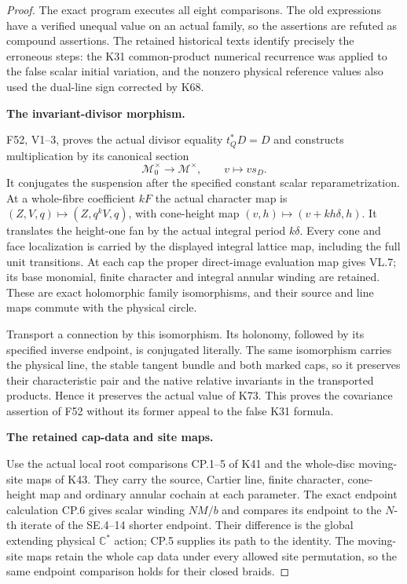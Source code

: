 \begin{proof}
The exact program
executes all eight comparisons. The old expressions have a
verified unequal value on an actual family, so the assertions
are refuted as compound assertions. The retained historical
texts identify precisely the erroneous steps: the K31
common-product numerical recurrence was applied to the false
scalar initial variation, and the nonzero physical reference
values also used the dual-line sign corrected by K68.

\par\medskip\noindent\textbf{The invariant-divisor morphism.}\par\nopagebreak[4]
F52, V1--3, proves the actual divisor equality \(t_Q^*D=D\)
and constructs multiplication by its canonical section
\[
 \mathcal M_0^\times\longrightarrow\mathcal M^\times,
 \qquad v\longmapsto v s_D.
\]
It conjugates the suspension after the specified constant
scalar reparametrization. At a whole-fibre coefficient \(kF\)
the actual character map is
\((Z,V,q)\mapsto(Z,q^kV,q)\), with cone-height map
\((v,h)\mapsto(v+kh\delta,h)\). It translates the
height-one fan by the actual integral period \(k\delta\).
Every cone and face localization is carried by the displayed
integral lattice map, including the full unit transitions.
At each cap the proper direct-image evaluation map gives
VL.7; its base monomial, finite character and integral annular
winding are retained. These are exact holomorphic family
isomorphisms, and their source and line maps commute with
the physical circle.

Transport a connection by this isomorphism. Its holonomy,
followed by its specified inverse endpoint, is conjugated
literally. The same isomorphism carries the physical line,
the stable tangent bundle and both marked caps, so it
preserves their characteristic pair and the native relative
invariants in the transported products. Hence it preserves
the actual value of K73. This proves the covariance assertion
of F52 without its former appeal to the false K31 formula.

\par\medskip\noindent\textbf{The retained cap-data and site maps.}\par\nopagebreak[4]
Use the actual local root comparisons CP.1--5 of K41 and
the whole-disc moving-site maps of K43. They carry the
source, Cartier line, finite character, cone-height map and
ordinary annular cochain at each parameter. The exact
endpoint calculation CP.6 gives scalar winding \(NM/b\)
and compares its endpoint to the \(N\)-th iterate of the
SE.4--14 shorter endpoint. Their difference is the global
extending physical \(\mathbb C^*\) action; CP.5 supplies
its path to the identity. The moving-site maps retain the
whole cap data under every allowed site permutation, so
the same endpoint comparison holds for their closed braids.


\end{proof}
